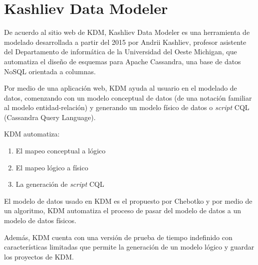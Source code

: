 \section{Kashliev Data Modeler}
De acuerdo al sitio web de KDM\cite{datafluent_kashliev_2020}, Kashliev Data Modeler es una herramienta de modelado desarrollada a partir del 2015 por Andrii Kashliev, profesor asistente del Departamento de informática de la Universidad del Oeste Michigan, que automatiza el diseño de esquemas para Apache Cassandra, una base de datos NoSQL orientada a columnas. 


Por medio de una aplicación web, KDM ayuda al usuario en el modelado de datos, comenzando con un modelo conceptual de datos (de una notación familiar al modelo entidad-relación) y generando un modelo físico de datos o \textit{script} CQL (Cassandra Query Language). 


KDM automatiza: 

\begin{enumerate}
    \item El mapeo conceptual a lógico
    \item El mapeo lógico a físico
    \item La generación de \textit{script} CQL 
\end{enumerate}

El modelo de datos usado en KDM es el propuesto por Chebotko\cite{chebotko_big_2015} y por medio de un algoritmo, KDM automatiza el proceso de pasar del modelo de datos a un modelo de datos físicos. 


Además, KDM cuenta con una versión de prueba de tiempo indefinido con características limitadas que permite la generación de un modelo lógico y guardar los proyectos de KDM.

